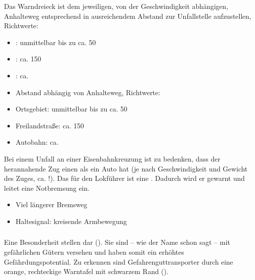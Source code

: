 {%
Das Warndreieck ist
dem jeweiligen, von der Geschwindigkeit abhängigen, Anhalteweg 
entsprechend in ausreichendem Abstand zur Unfallstelle
aufzustellen, Richtwerte:
\begin{itemize}
  \item {}: unmittelbar bis zu ca. 50\Meter*
  \item {}: ca. 150\Meter*
  \item {}: ca. \Meter*
\end{itemize}
}{
\begin{itemize}
  \item Abstand abhängig von Anhalteweg, Richtwerte:
\end{itemize}
\begin{itemize}
  \item {Ortsgebiet}: unmittelbar bis zu ca. 50\Meter*
  \item {Freilandstraße}: ca. 150\Meter*
  \item {Autobahn}: ca. \Meter*
\end{itemize}
}{}{}{}

{
Bei einem Unfall an einer Eisenbahnkreuzung ist zu bedenken, dass der
herannahende Zug einen  als ein
Auto hat (je nach Geschwindigkeit und
Gewicht des Zuges, ca. \Meter*!). Das
 für den Lokführer ist eine . 
Dadurch wird er gewarnt und leitet 
eine Notbremsung ein.
}{
\begin{itemize}
  \item Viel längerer Bremsweg
  \item Haltesignal: kreisende Armbewegung
\end{itemize}
}{}{}{}



\subsubsection{}


\Text
{{\TxBeschreibung}}%
{%
Eine Besonderheit stellen  dar
(). Sie sind -- wie der Name
schon sagt -- mit gefährlichen Gütern versehen und haben
somit ein erhöhtes Gefährdungspotential. Zu erkennen sind
Gefahrenguttransporter durch eine orange, rechteckige
Warntafel mit schwarzem Rand
().
}%



